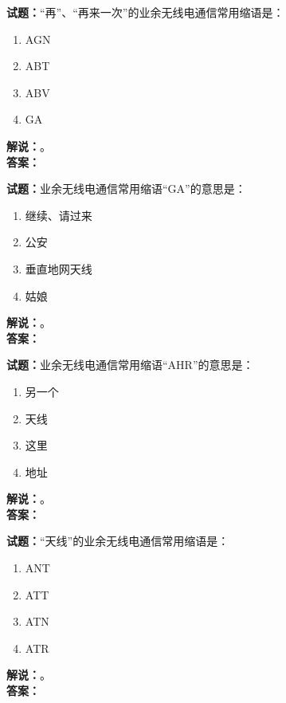 \documentclass{ctexbook}
\begin{document}
\vspace{\baselineskip}

\noindent\textbf{试题：}“再”、“再来一次”的业余无线电通信常用缩语是：
\begin{enumerate}[leftmargin=3em]
  \item AGN
  \item ABT
  \item ABV
  \item GA
\end{enumerate}
\noindent\textbf{解说：}\textbf{}。\\\noindent\textbf{答案：}

\vspace{\baselineskip}

\noindent\textbf{试题：}业余无线电通信常用缩语“GA”的意思是：
\begin{enumerate}[leftmargin=3em]
  \item 继续、请过来
  \item 公安
  \item 垂直地网天线
  \item 姑娘
\end{enumerate}
\noindent\textbf{解说：}\textbf{}。\\\noindent\textbf{答案：}

\vspace{\baselineskip}

\noindent\textbf{试题：}业余无线电通信常用缩语“AHR”的意思是：
\begin{enumerate}[leftmargin=3em]
  \item 另一个
  \item 天线
  \item 这里
  \item 地址
\end{enumerate}
\noindent\textbf{解说：}\textbf{}。\\\noindent\textbf{答案：}

\vspace{\baselineskip}

\noindent\textbf{试题：}“天线”的业余无线电通信常用缩语是：
\begin{enumerate}[leftmargin=3em]
  \item ANT
  \item ATT
  \item ATN
  \item ATR
\end{enumerate}
\noindent\textbf{解说：}\textbf{}。\\\noindent\textbf{答案：}
\end{document}
